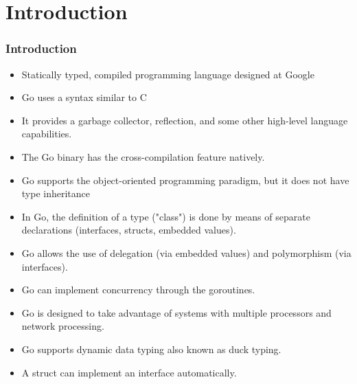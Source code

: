 \section{Introduction}
\frame
{
\frametitle{Introduction}
\begin{itemize}
\item Statically typed, compiled programming language designed at Google
\item Go uses a syntax similar to C
\item It provides a garbage collector, reflection, and some other high-level language capabilities.
\item The Go binary has the cross-compilation feature natively.
\item Go supports the object-oriented programming paradigm, but it does not have type inheritance
\item In Go, the definition of a type ("class") is done by means of separate declarations (interfaces, structs, embedded values).
\item Go allows the use of delegation (via embedded values) and polymorphism (via interfaces).
\item Go can implement concurrency through the goroutines.
\item Go is designed to take advantage of systems with multiple processors and network processing.
\item Go supports dynamic data typing also known as duck typing.
\item A struct can implement an interface automatically. 

\end{itemize}
}
